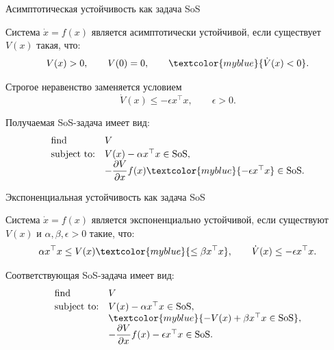 \documentclass{beamer}
\begin{document}
\begin{frame}{Асимптотическая устойчивость как задача SoS}
	\begin{flushleft}
		Система $\dot{x}=f(x)$	является асимптотически устойчивой, если существует $V(x)$ такая, что:
		\[
		V(x)>0,\qquad V(0)=0,\qquad
		\textcolor{myblue}{\dot V(x)<0}.
		\]
		
		Строгое неравенство заменяется условием
		\[
		\dot V(x)\leq-\epsilon x^\top x,
		\qquad \epsilon>0.
		\]
		
		Получаемая SoS-задача имеет вид:
		\[
		\begin{array}{ll}
			\text{find} & V\\[0.2em]
			\text{subject to:} &
			V(x)-\alpha x^\top x\in\mathrm{SoS},\\
			&
			-\dfrac{\partial V}{\partial x}f(x)
			\textcolor{myblue}{-\epsilon x^\top x}\in\mathrm{SoS}.
		\end{array}
		\]
	\end{flushleft}
	
\end{frame}


\begin{frame}{Экспоненциальная устойчивость как задача SoS}
	\begin{flushleft}
		Система $\dot{x}=f(x)$	является экспоненциально устойчивой, если существуют $V(x)$ и
		$\alpha,\beta,\epsilon>0$ такие, что:
		\[
		\alpha x^\top x
		\leq V(x)
		\textcolor{myblue}{\leq \beta x^\top x},\qquad 
		\dot V(x)\leq-\epsilon x^\top x.
		\]
		
		\bigskip
		
		Соответствующая SoS-задача имеет вид:
		\[
		\begin{array}{ll}
			\text{find} & V\\[0.2em]
			\text{subject to:} &
			V(x)-\alpha x^\top x\in\mathrm{SoS},\\
			&
			\textcolor{myblue}{-V(x)+\beta x^\top x\in\mathrm{SoS}},\\
			&
			-\dfrac{\partial V}{\partial x}f(x)
			-\epsilon x^\top x\in\mathrm{SoS}.
		\end{array}
		\]
	\end{flushleft}
	
\end{frame}
\end{document}
